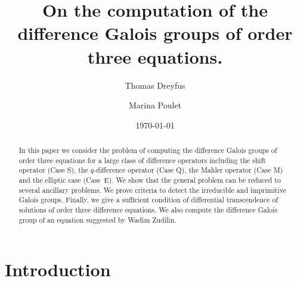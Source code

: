 \documentclass[a4paper,11pt]{amsart}
\title[On the computation of the difference Galois groups of order three eq.]{On the computation of the difference Galois groups of order three equations.}
\author{Thomas Dreyfus}
\author{Marina Poulet }
\date{\today}
\begin{document}
\begin{abstract} 
In this paper we consider the problem of computing the difference Galois groups of order three equations for a large class of difference operators including the shift operator (Case S), the $q$-difference operator (Case Q),  the Mahler operator (Case M) and the elliptic case (Case~E).  We show that the general problem can be reduced to several ancillary problems. We prove criteria to detect the irreducible and imprimitive Galois groups.  Finally,  we give a sufficient condition  of differential transcendence of solutions of order three difference equations.  We also compute the difference Galois group of an equation suggested by Wadim Zudilin. 
\end{abstract}


\maketitle



\section{Introduction}
\end{document}
